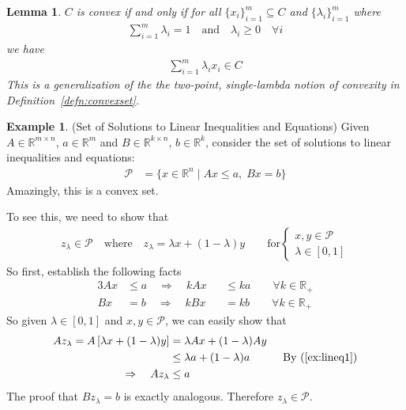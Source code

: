 \documentclass[12pt]{book}
\numberwithin{equation}{section} %
\theoremstyle{plain}
\newtheorem{lem}[thm]{Lemma}
\theoremstyle{definition}
\newtheorem{ex}[thm]{Example}
\theoremstyle{remark}
\newcommand{\R}{\mathbb{R}}
\newcommand{\Rn}{\mathbb{R}^n}
\begin{document}
\begin{lem}
$C$ is convex if and only if
for all $\{x_i\}_{i=1}^m \subseteq C$ and $\{\lambda_i\}_{i=1}^m$ where
\begin{align*}
  \sum^{m}_{i=1} \lambda_i = 1
  \quad \text{and} \quad \lambda_i \geq 0 \quad \forall i
\end{align*}
we have
\begin{align*}
  \sum^m_{i=1} \lambda_i x_i \in C
\end{align*}
This is a generalization of the the two-point, single-lambda notion of
convexity in Definition~\ref{defn:convexset}.
\end{lem}

\begin{ex}{(Set of Solutions to Linear Inequalities and Equations)}
Given $A \in \R^{m\times n}$, $a\in \R^m$ and $B \in \R^{k \times n}$,
$b\in \R^k$, consider the set of solutions to linear inequalities and
equations:
\begin{align*}
  \mathscr{P}
  &= \{
  x\in \Rn \; | \; Ax \leq a, \; Bx = b
  \}
\end{align*}
Amazingly, this is a convex set.

To see this, we need to show that
\begin{align*}
  z_\lambda \in \mathscr{P}
  \quad \text{where} \quad
  z_\lambda = \lambda x + (1-\lambda)y
  \qquad
  \text{for}
  \begin{cases}
  x,y\in \mathscr{P}\\
  \lambda \in [0,1]
  \end{cases}
\end{align*}
So first, establish the following facts
\begin{alignat}{3}
  Ax &\leq a \quad \Rightarrow \quad
  k Ax &&\leq k a
  \qquad \forall k \in \R_+ \label{ex:lineq1}\\
  Bx &= b \quad \Rightarrow \quad
  k Bx &&= k b
  \qquad \forall k \in \R_+
  \label{ex:lineq2}
\end{alignat}
So given $\lambda \in [0,1]$ and $x,y\in \mathscr{P}$, we can easily
show that
\begin{align*}
  Az_\lambda
  = A\left[\lambda x + (1-\lambda) y\right]
  &= \lambda Ax + (1-\lambda) Ay \\
  &\leq \lambda a + (1-\lambda) a
  \quad\qquad \text{By~(\ref{ex:lineq1})} \\
  \Rightarrow \quad
  Az_\lambda
  &\leq a
\end{align*}
The proof that $Bz_\lambda = b$ is exactly analogous. Therefore
$z_\lambda\in \mathscr{P}$.
\end{ex}
\end{document}
